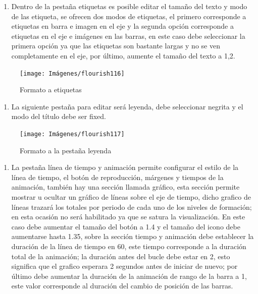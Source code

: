 \documentclass[
]{book}
\providecommand{\tightlist}{%
  \setlength{\itemsep}{0pt}\setlength{\parskip}{0pt}}
\begin{document}
\begin{enumerate}
\def\labelenumi{\arabic{enumi}.}
\setcounter{enumi}{6}
\tightlist
\item
  Dentro de la pestaña etiquetas es posible editar el tamaño del texto y modo de las etiqueta, se ofrecen dos modos de etiquetas, el primero corresponde a etiquetas en barra e imagen en el eje y la segunda opción corresponde a etiquetas en el eje e imágenes en las barras, en este caso debe seleccionar la primera opción ya que las etiquetas son bastante largas y no se ven completamente en el eje, por último, aumente el tamaño del texto a 1,2.
\end{enumerate}

\begin{figure}

{\centering \texttt{[image: Imágenes/flourish116]} 

}

\caption{Formato a etiquetas}\label{fig:paso7carrerabarrasflourish-fig}
\end{figure}

\begin{enumerate}
\def\labelenumi{\arabic{enumi}.}
\setcounter{enumi}{7}
\tightlist
\item
  La siguiente pestaña para editar será leyenda, debe seleccionar negrita y el modo del título debe ser fixed.
\end{enumerate}

\begin{figure}

{\centering \texttt{[image: Imágenes/flourish117]} 

}

\caption{Formato a la pestaña leyenda}\label{fig:paso8carrerabarrasflourish-fig}
\end{figure}

\begin{enumerate}
\def\labelenumi{\arabic{enumi}.}
\setcounter{enumi}{8}
\tightlist
\item
  La pestaña línea de tiempo y animación permite configurar el estilo de la línea de tiempo, el botón de reproducción, márgenes y tiempos de la animación, también hay una sección llamada gráfico, esta sección permite mostrar u ocultar un gráfico de líneas sobre el eje de tiempo, dicho grafico de líneas trazará los totales por periodo de cada uno de los niveles de formación; en esta ocasión no será habilitado ya que se satura la visualización. En este caso debe aumentar el tamaño del botón a 1.4 y el tamaño del icono debe aumentarse hasta 1.35, sobre la sección tiempo y animación debe establecer la duración de la línea de tiempo en 60, este tiempo corresponde a la duración total de la animación; la duración antes del bucle debe estar en 2, esto significa que el grafico esperara 2 segundos antes de iniciar de nuevo; por último debe aumentar la duración de la animación de rango de la barra a 1, este valor corresponde al duración del cambio de posición de las barras.
\end{enumerate}
\end{document}
